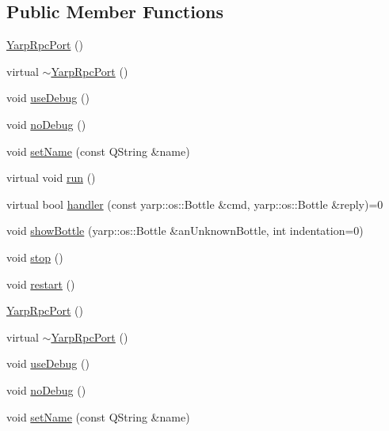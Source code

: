 \subsection*{Public Member Functions}
\begin{DoxyCompactItemize}
\item 
\hyperlink{class_robot_model_1_1_yarp_rpc_port_a393b44f37d77b25d8c5cb7f14609c4d5}{YarpRpcPort} ()
\item 
virtual \hyperlink{class_robot_model_1_1_yarp_rpc_port_acf21bbb8e38b69fd9c3769a2f9b45743}{$\sim$YarpRpcPort} ()
\item 
void \hyperlink{class_robot_model_1_1_yarp_rpc_port_a6fe22d6e8403cb3560964dd31d66c243}{useDebug} ()
\item 
void \hyperlink{class_robot_model_1_1_yarp_rpc_port_a87e299eb43783a25cd71def0e50eb9dc}{noDebug} ()
\item 
void \hyperlink{class_robot_model_1_1_yarp_rpc_port_aa30cabbf5681b128766ad8556c33cd65}{setName} (const QString \&name)
\item 
virtual void \hyperlink{class_robot_model_1_1_yarp_rpc_port_a3e4c1be7ae685d9478b38d71255b1bcd}{run} ()
\item 
virtual bool \hyperlink{class_robot_model_1_1_yarp_rpc_port_a156879aeb8b6641c0f63a6633af8c568}{handler} (const yarp::os::Bottle \&cmd, yarp::os::Bottle \&reply)=0
\item 
void \hyperlink{class_robot_model_1_1_yarp_rpc_port_ae26626cb99ca15bfec5e5162845018c2}{showBottle} (yarp::os::Bottle \&anUnknownBottle, int indentation=0)
\item 
void \hyperlink{class_robot_model_1_1_yarp_rpc_port_a1554e6c2e38cb71f2521280f65bbab05}{stop} ()
\item 
void \hyperlink{class_robot_model_1_1_yarp_rpc_port_a93d242e15bb04534f7db4fe6636a0086}{restart} ()
\item 
\hyperlink{class_robot_model_1_1_yarp_rpc_port_a056dd5174b17abd2a530eb9c77c1badb}{YarpRpcPort} ()
\item 
virtual \hyperlink{class_robot_model_1_1_yarp_rpc_port_acc982a6fdf62ef56ff39bd4ca56375cd}{$\sim$YarpRpcPort} ()
\item 
void \hyperlink{class_robot_model_1_1_yarp_rpc_port_a6fe22d6e8403cb3560964dd31d66c243}{useDebug} ()
\item 
void \hyperlink{class_robot_model_1_1_yarp_rpc_port_a87e299eb43783a25cd71def0e50eb9dc}{noDebug} ()
\item 
void \hyperlink{class_robot_model_1_1_yarp_rpc_port_aa30cabbf5681b128766ad8556c33cd65}{setName} (const QString \&name)

\end{DoxyCompactItemize}
